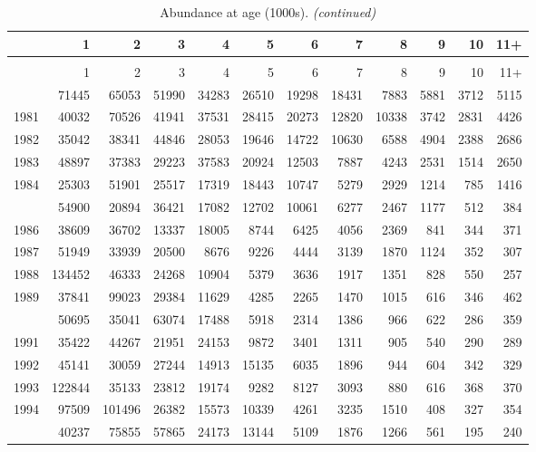\documentclass[
]{article}
\begin{document}
\begin{longtable}[t]{lrrrrrrrrrrr}
\caption{\label{tab:NAA-table}Abundance at age (1000s).}\\
\toprule
  & 1 & 2 & 3 & 4 & 5 & 6 & 7 & 8 & 9 & 10 & 11+\\
\midrule
\endfirsthead
\caption[]{Abundance at age (1000s). \textit{(continued)}}\\
\toprule
  & 1 & 2 & 3 & 4 & 5 & 6 & 7 & 8 & 9 & 10 & 11+\\
\midrule
\endhead

\endfoot
\bottomrule
\endlastfoot
1980 & 71445 & 65053 & 51990 & 34283 & 26510 & 19298 & 18431 & 7883 & 5881 & 3712 & 5115\\
1981 & 40032 & 70526 & 41941 & 37531 & 28415 & 20273 & 12820 & 10338 & 3742 & 2831 & 4426\\
1982 & 35042 & 38341 & 44846 & 28053 & 19646 & 14722 & 10630 & 6588 & 4904 & 2388 & 2686\\
1983 & 48897 & 37383 & 29223 & 37583 & 20924 & 12503 & 7887 & 4243 & 2531 & 1514 & 2650\\
1984 & 25303 & 51901 & 25517 & 17319 & 18443 & 10747 & 5279 & 2929 & 1214 & 785 & 1416\\
\addlinespace
1985 & 54900 & 20894 & 36421 & 17082 & 12702 & 10061 & 6277 & 2467 & 1177 & 512 & 384\\
1986 & 38609 & 36702 & 13337 & 18005 & 8744 & 6425 & 4056 & 2369 & 841 & 344 & 371\\
1987 & 51949 & 33939 & 20500 & 8676 & 9226 & 4444 & 3139 & 1870 & 1124 & 352 & 307\\
1988 & 134452 & 46333 & 24268 & 10904 & 5379 & 3636 & 1917 & 1351 & 828 & 550 & 257\\
1989 & 37841 & 99023 & 29384 & 11629 & 4285 & 2265 & 1470 & 1015 & 616 & 346 & 462\\
\addlinespace
1990 & 50695 & 35041 & 63074 & 17488 & 5918 & 2314 & 1386 & 966 & 622 & 286 & 359\\
1991 & 35422 & 44267 & 21951 & 24153 & 9872 & 3401 & 1311 & 905 & 540 & 290 & 289\\
1992 & 45141 & 30059 & 27244 & 14913 & 15135 & 6035 & 1896 & 944 & 604 & 342 & 329\\
1993 & 122844 & 35133 & 23812 & 19174 & 9282 & 8127 & 3093 & 880 & 616 & 368 & 370\\
1994 & 97509 & 101496 & 26382 & 15573 & 10339 & 4261 & 3235 & 1510 & 408 & 327 & 354\\
\addlinespace
1995 & 40237 & 75855 & 57865 & 24173 & 13144 & 5109 & 1876 & 1266 & 561 & 195 & 240\\

\end{longtable}
\end{document}

